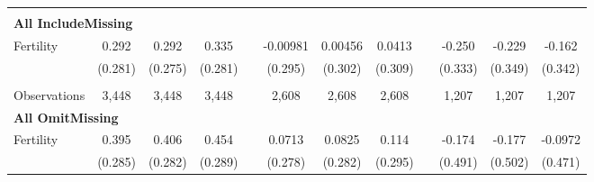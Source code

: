 \begin{landscape}
\begin{table}[htpb!]
\begin{center}
\begin{tabular}{lcccp{2mm}cccp{2mm}ccc}
\begin{footnotesize}\end{footnotesize}\\ 
\multicolumn{12}{l}{\textbf{All IncludeMissing}}\\ 
Fertility&0.292&0.292&0.335&&-0.00981&0.00456&0.0413&&-0.250&-0.229&-0.162\\
&(0.281)&(0.275)&(0.281)&&(0.295)&(0.302)&(0.309)&&(0.333)&(0.349)&(0.342)\\
\begin{footnotesize}\end{footnotesize}&\begin{footnotesize}\end{footnotesize}&\begin{footnotesize}\end{footnotesize}&\begin{footnotesize}\end{footnotesize}&\begin{footnotesize}\end{footnotesize}&\begin{footnotesize}\end{footnotesize}&\begin{footnotesize}\end{footnotesize}&\begin{footnotesize}\end{footnotesize}&\begin{footnotesize}\end{footnotesize}&\begin{footnotesize}\end{footnotesize}&\begin{footnotesize}\end{footnotesize}&\begin{footnotesize}\end{footnotesize}\\Observations&3,448&3,448&3,448&&2,608&2,608&2,608&&1,207&1,207&1,207\\
\multicolumn{12}{l}{\textbf{All OmitMissing}}\\ 
Fertility&0.395&0.406&0.454&&0.0713&0.0825&0.114&&-0.174&-0.177&-0.0972\\
&(0.285)&(0.282)&(0.289)&&(0.278)&(0.282)&(0.295)&&(0.491)&(0.502)&(0.471)\\

\end{tabular}
\end{center}
\end{table}
\end{landscape}

